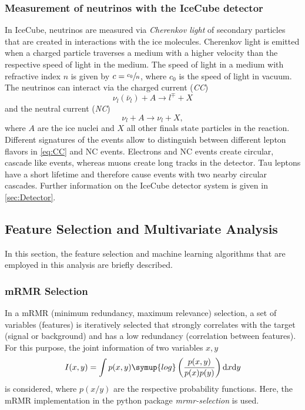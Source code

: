 \subsubsection{Measurement of neutrinos with the IceCube detector}
In IceCube, neutrinos are measured via \textit{Cherenkov light} of secondary particles that are created in interactions with the ice molecules.
Cherenkov light is emitted when a charged particle traverses a medium with a higher velocity than the respective speed of light in the medium.
The speed of light in a medium  with refractive index $n$ is given by $c = \sfrac{c_0}{n}$, where $c_0$ is the speed of light in vacuum.
The neutrinos can interact via the charged current (\textit{CC})
\begin{equation}
    \nu_l(\bar{\nu}_l) + A \to l^\mp + X
    \label{eq:CC}
\end{equation}
and the neutral current (\textit{NC})
\begin{equation}
    \nu_l + A \to \nu_l + X,
    \label{eq:NC}
\end{equation}
where $A$ are the ice nuclei and $X$ all other finals state particles in the reaction. Different signatures of the events allow to distinguish between 
different lepton flavors in \autoref{eq:CC} and NC events. 
Electrons and NC events create circular, cascade like events, whereas muons create long tracks in the detector. Tau leptons have a short lifetime and therefore 
cause events with two nearby circular cascades. Further information on the IceCube detector system is given in \autoref{sec:Detector}.

\subsection{Feature Selection and Multivariate Analysis}
In this section, the feature selection and machine learning algorithms that are employed in this analysis are briefly described.
\subsubsection{mRMR Selection}
\label{subsec:mRMR}
In a mRMR (minimum redundancy, maximum relevance) selection, a set of variables (features) is iteratively selected that strongly correlates with the target (signal or background)
and has a low redundancy (correlation between features). For this purpose, the joint information of two variables $x, y$
\begin{equation}
    I(x, y) = \int p(x,y) \symup{log}\left(\frac{p(x,y)}{p(x)p(y)}\right)\mathrm{d}x\mathrm{d}y
    \label{eq:mRMR}
\end{equation}
is considered, where $p(x/y)$ are the respective probability functions. Here, the mRMR implementation in the python package \textit{mrmr-selection} \cite{mrmr} is used.

